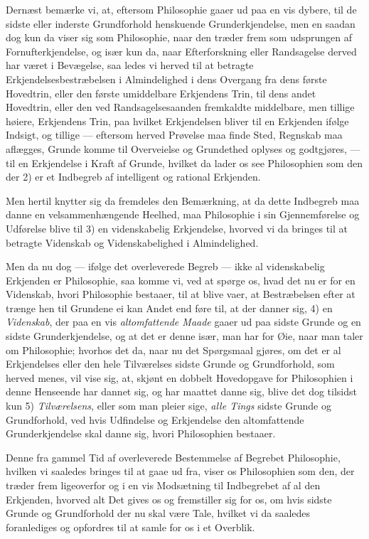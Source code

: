 \documentclass[12pt,a4paper]{book}
\newcommand{\apage}[1]{\marginnote{\footnotesize\textit{[#1]}}}
\begin{document}
Dernæst bemærke vi, at, eftersom Philosophie gaaer ud paa en vis dybere, til de
sidste eller inderste Grundforhold henskuende Grunderkjendelse, men en saadan
dog kun da viser sig som Philosophie, naar den træder frem som udsprungen af
Fornufterkjendelse, og især kun da, naar Efterforskning eller Randsagelse
derved har været \apage{5}  i Bevægelse, saa ledes vi herved til at betragte
Erkjendelsesbestræbelsen i Almindelighed i dens Overgang fra dens første
Hovedtrin, eller den første umiddelbare Erkjendens Trin, til dens andet
Hovedtrin, eller den ved Randsagelsesaanden fremkaldte middelbare, men tillige
høiere, Erkjendens Trin, paa hvilket Erkjendelsen bliver til en Erkjenden
ifølge Indsigt, og tillige --- eftersom herved Prøvelse maa finde Sted,
Regnskab maa aflægges, Grunde komme til Overveielse og Grundethed oplyses og
godtgjøres, --- til en Erkjendelse i Kraft af Grunde, hvilket da lader os see
Philosophien som den der 2) er et Indbegreb af intelligent og rational
Erkjenden.

Men hertil knytter sig da fremdeles den Bemærkning, at da dette Indbegreb maa
danne en velsammenhængende Heelhed, maa Philosophie i sin Gjennemførelse og
Udførelse blive til 3) en videnskabelig Erkjendelse, hvorved vi da bringes til
at betragte Videnskab og Videnskabelighed i Almindelighed.

Men da nu dog --- ifølge det overleverede Begreb --- ikke al videnskabelig
Erkjenden er Philosophie, saa komme vi, ved at spørge os, hvad det nu er for en
Videnskab, hvori Philosophie bestaaer, til at blive vaer, at Bestræbelsen efter
at trænge hen til Grundene ei kan Andet end føre til, at der danner sig, 4) en
\emph{Videnskab}, der paa en vis \emph{altomfattende Maade} gaaer ud paa sidste
Grunde og en sidste Grunderkjendelse, og at det er denne især, man har for Øie,
naar man taler om Philosophie; hvorhos det da, naar nu det Spørgsmaal gjøres,
om det er al Erkjendelses eller den hele Tilværelses sidste Grunde og
Grundforhold, som herved menes, vil vise sig, at, skjønt en dobbelt
Hovedopgave for Philosophien i denne Henseende har dannet sig, og har maattet
danne sig, blive det dog tilsidst kun  \apage{6} 5) \emph{Tilværelsens}, eller som man
pleier sige, \emph{alle Tings} sidste Grunde og Grundforhold, ved hvis
Udfindelse og Erkjendelse den altomfattende Grunderkjendelse skal danne sig,
hvori Philosophien bestaaer.

Denne fra gammel Tid af overleverede Bestemmelse af Begrebet Philosophie,
hvilken vi saaledes bringes til at gaae ud fra, viser os Philosophien som den,
der træder frem ligeoverfor og i en vis Modsætning til Indbegrebet af al den
Erkjenden, hvorved alt Det gives os og fremstiller sig for os, om hvis sidste
Grunde og Grundforhold der nu skal være Tale, hvilket vi da saaledes
foranlediges og opfordres til at samle for os i et Overblik.
\end{document}
